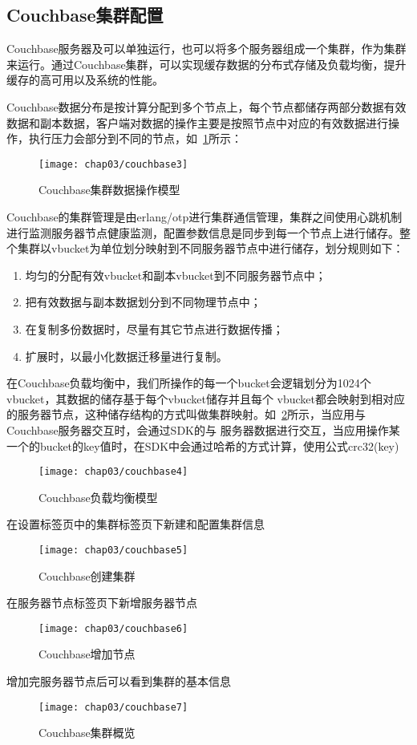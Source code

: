 \subsection{Couchbase集群配置}
Couchbase服务器及可以单独运行，也可以将多个服务器组成一个集群，作为集群来运行。通过Couchbase集群，可以实现缓存数据的分布式存储及负载均衡，提升缓存的高可用以及系统的性能。

Couchbase数据分布是按计算分配到多个节点上，每个节点都储存两部分数据有效数据和副本数据，客户端对数据的操作主要是按照节点中对应的有效数据进行操作，执行压力会部分到不同的节点，如~\ref{fig:couchbase3}所示：
\begin{figure}[H] %
  \centering
  \texttt{[image: chap03/couchbase3]}
  \caption{Couchbase集群数据操作模型}
  \label{fig:couchbase3}
\end{figure}
Couchbase的集群管理是由erlang/otp进行集群通信管理，集群之间使用心跳机制进行监测服务器节点健康监测，配置参数信息是同步到每一个节点上进行储存。整个集群以vbucket为单位划分映射到不同服务器节点中进行储存，划分规则如下：
\begin{enumerate}
\item 均匀的分配有效vbucket和副本vbucket到不同服务器节点中；
\item 把有效数据与副本数据划分到不同物理节点中；
\item 在复制多份数据时，尽量有其它节点进行数据传播；
\item 扩展时，以最小化数据迁移量进行复制。
\end{enumerate}

在Couchbase负载均衡中，我们所操作的每一个bucket会逻辑划分为1024个vbucket，其数据的储存基于每个vbucket储存并且每个 vbucket都会映射到相对应的服务器节点，这种储存结构的方式叫做集群映射。如~\ref{fig:couchbase4}所示，当应用与Couchbase服务器交互时，会通过SDK的与 服务器数据进行交互，当应用操作某一个的bucket的key值时，在SDK中会通过哈希的方式计算，使用公式crc32(key)%
\begin{figure}[H] %
  \centering
  \texttt{[image: chap03/couchbase4]}
  \caption{Couchbase负载均衡模型}
  \label{fig:couchbase4}
\end{figure}
在设置标签页中的集群标签页下新建和配置集群信息
\begin{figure}[H] %
  \centering
  \texttt{[image: chap03/couchbase5]}
  \caption{Couchbase创建集群}
  \label{fig:couchbase5}
\end{figure}
在服务器节点标签页下新增服务器节点
\begin{figure}[H] %
  \centering
  \texttt{[image: chap03/couchbase6]}
  \caption{Couchbase增加节点}
  \label{fig:couchbase6}
\end{figure}
增加完服务器节点后可以看到集群的基本信息
\begin{figure}[H] %
  \centering
  \texttt{[image: chap03/couchbase7]}
  \caption{Couchbase集群概览}
  \label{fig:couchbase7}
\end{figure}

